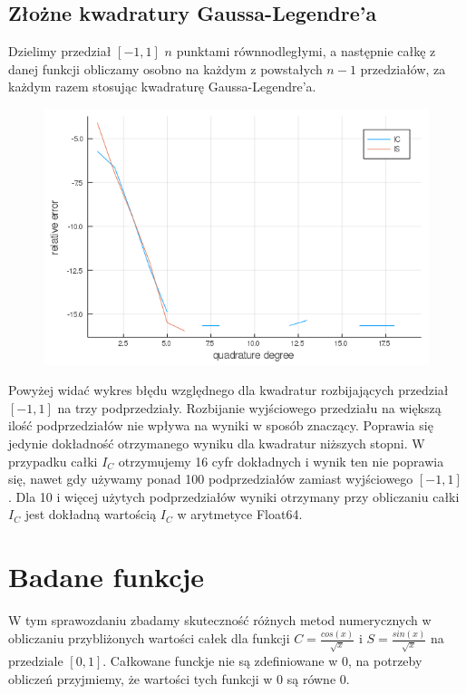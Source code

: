\documentclass{article}
\begin{document}
\subsection*{Złożne kwadratury Gaussa-Legendre'a}
	Dzielimy przedział $[-1,1]$ $n$ punktami równnodległymi, a następnie całkę z danej funkcji obliczamy osobno na każdym z powstałych $n-1$ przedziałów, za każdym razem stosując kwadraturę Gaussa-Legendre'a. 

\begin{figure}[ht]
    \includegraphics[scale=0.5]{WykresD2relative.png}
    \label{WykresD2rel}
\end{figure}
Powyżej widać wykres błędu względnego dla kwadratur rozbijających przedział $[-1,1]$ na trzy podprzedziały. Rozbijanie wyjściowego przedziału na większą ilość podprzedziałów nie wpływa na wyniki w sposób znaczący. Poprawia się jedynie dokładność otrzymanego wyniku dla kwadratur niższych stopni. W przypadku całki $I_C$ otrzymujemy 16 cyfr dokładnych i wynik ten nie poprawia się, nawet gdy używamy ponad 100 podprzedziałów zamiast wyjściowego $[-1,1]$. Dla 10 i więcej użytych podprzedziałów wyniki otrzymany przy obliczaniu całki $I_C$ jest dokładną wartością $I_C$ w arytmetyce Float64.  

\section*{Badane funkcje}
W tym sprawozdaniu zbadamy skuteczność różnych metod numerycznych w obliczaniu przybliżonych wartości całek dla funkcji $C = \frac{cos(x)}{\sqrt{x}}$ i $S = \frac{sin(x)}{\sqrt{x}}$ na przedziale $[0, 1]$. Całkowane funckje nie są zdefiniowane w $0$, na potrzeby obliczeń przyjmiemy, że wartości tych funkcji w $0$ są równe $0$. 
\end{document}
